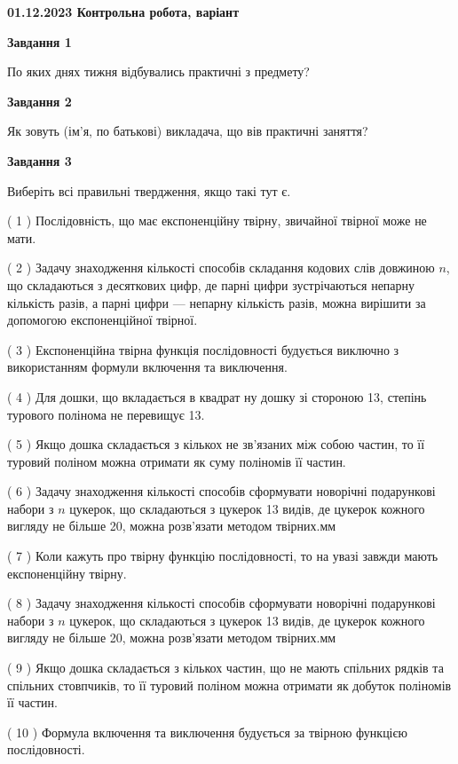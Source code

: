\documentclass[12pt, ukrainian]{article}
\begin{document}
\begin {large}

\textbf{01.12.2023 Контрольна робота, варіант  }\par


{
{\begin {center}\textbf{Завдання 1}\end {center}}\par
По яких днях тижня відбувались практичні з предмету?\par
{\begin {center}\textbf{Завдання 2}\end {center}}\par
Як зовуть (ім'я, по батькові) викладача, що вів практичні заняття?\par
{\begin {center}\textbf{Завдання 3}\end {center}}\par
Виберіть всі правильні твердження, якщо такі тут є.\par
\vspace{2mm}
( 1 ) Послідовність, що має експоненційну твірну, звичайної твірної може не мати.%

( 2 ) Задачу знаходження кількості способів складання кодових слів довжиною $n$, що складаються з десяткових цифр, де парні цифри зустрічаються непарну кількість разів, а парні цифри — непарну кількість разів, можна вирішити за допомогою експоненційної твірної.%

( 3 ) Експоненційна твірна функція послідовності будується виключно з використанням формули включення та виключення.%

( 4 ) Для дошки, що вкладається в квадрат ну дошку зі стороною 13, степінь турового полінома не перевищує 13.%

( 5 ) Якщо дошка складається з кількох не зв’язаних між собою частин, то її туровий поліном можна отримати як суму поліномів її частин.%

( 6 ) Задачу знаходження кількості способів сформувати новорічні подарункові набори з $n$ цукерок, що складаються з цукерок 13 видів, де цукерок кожного вигляду не більше 20, можна розв’язати методом твірних.мм%

( 7 ) Коли кажуть про твірну функцію послідовності, то на увазі завжди мають експоненційну твірну.%

( 8 ) Задачу знаходження кількості способів сформувати новорічні подарункові набори з $n$ цукерок, що складаються з цукерок 13 видів, де цукерок кожного вигляду не більше 20, можна розв’язати методом твірних.мм%

( 9 ) Якщо дошка складається з кількох частин, що не мають спільних рядків та спільних стовпчиків, то її туровий поліном можна отримати як добуток поліномів її частин.%

( 10 ) Формула включення та виключення будується за твірною функцією послідовності.%
}
\end {large}

\vspace{4mm}
\newpage
\end{document}
